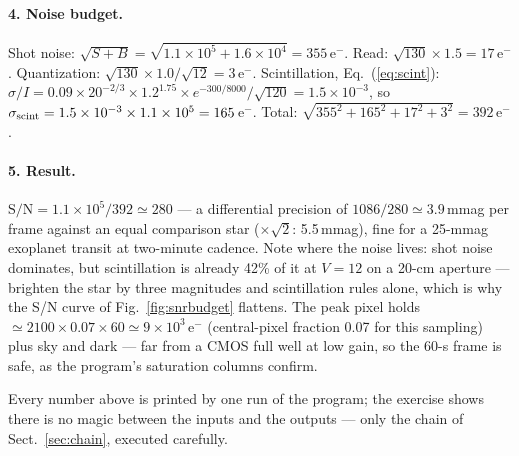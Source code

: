 \paragraph{4. Noise budget.} Shot noise: $\sqrt{S + B} =
\sqrt{1.1\times10^5 + 1.6\times10^4} = 355$\,e$^-$. Read:
$\sqrt{130}\times1.5 = 17$\,e$^-$. Quantization:
$\sqrt{130}\times 1.0/\sqrt{12} = 3$\,e$^-$. Scintillation,
Eq.~(\ref{eq:scint}): $\sigma/I = 0.09\times20^{-2/3}\times1.2^{1.75}
\times e^{-300/8000}/\sqrt{120} = 1.5\times10^{-3}$, so
$\sigma_{\rm scint} = 1.5\times10^{-3}\times1.1\times10^{5} =
165$\,e$^-$. Total: $\sqrt{355^2 + 165^2 + 17^2 + 3^2} = 392$\,e$^-$.

\paragraph{5. Result.} $\mathrm{S/N} = 1.1\times10^{5}/392 \simeq 280$
--- a differential precision of $1086/280 \simeq 3.9$\,mmag per frame
against an equal comparison star ($\times\sqrt2$: 5.5\,mmag), fine for
a 25-mmag exoplanet transit at two-minute cadence. Note where the noise
lives: shot noise dominates, but scintillation is already 42\% of it at
$V=12$ on a 20-cm aperture --- brighten the star by three magnitudes
and scintillation rules alone, which is why the S/N curve of
Fig.~\ref{fig:snrbudget} flattens. The peak pixel holds
$\simeq 2100\times0.07\times60 \simeq 9\times10^{3}$\,e$^-$
(central-pixel fraction 0.07 for this sampling) plus sky and dark ---
far from a CMOS full well at low gain, so the 60-s frame is safe, as the
program's saturation columns confirm.

Every number above is printed by one run of the program; the exercise
shows there is no magic between the inputs and the outputs --- only the
chain of Sect.~\ref{sec:chain}, executed carefully.
